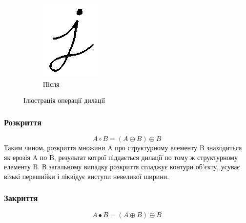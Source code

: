 \begin{figure}[H]
\begin{subfigure}[b]{0.2\textwidth}
			\includegraphics[width=\textwidth]{theory/img/dilate_after}
			\caption{Після}
			\label{fig:dilate_after}
		\end{subfigure}
		\caption{Ілюстрація операції дилації}
	\end{figure}

	
\subsubsection{Розкриття}
	\begin{equation}
	A \circ B = (A \ominus B) \oplus B
	\end{equation}
	Таким чином, розкриття множини A про структурному елементу B знаходиться як ерозія A по B, результат котрої піддається дилації по тому ж структурному елементу B. В загальному випадку розкриття сгладжує контури об’єкту, усуває візькі перешийки і ліквідує виступи невеликої ширини.
	
		
\subsubsection{Закриття}
	\begin{equation}
	A \bullet B = (A \oplus B) \ominus B
	\end{equation}
	
